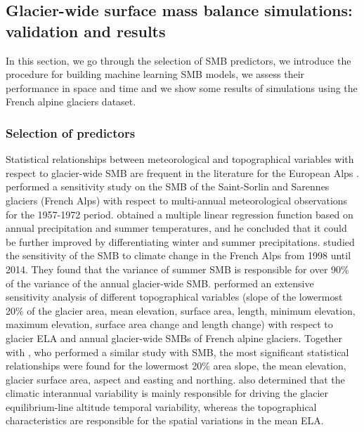 \subsection{Glacier-wide surface mass balance simulations: validation and results} \label{methods:case_study:SMB}

In this section, we go through the selection of SMB predictors, we introduce the procedure for building machine learning SMB models, we assess their performance in space and time and we show some results of simulations using the French alpine glaciers dataset. 

\subsubsection{Selection of predictors}

Statistical relationships between meteorological and topographical variables with respect to glacier-wide SMB are frequent in the literature for the European Alps \citep{hoinkes_glacier_1968}. \citet{martin_correlation_1974} performed a sensitivity study on the SMB of the Saint-Sorlin and Sarennes glaciers (French Alps) with respect to multi-annual meteorological observations for the 1957-1972 period. \citet{martin_correlation_1974} obtained a multiple linear regression function based on annual precipitation and summer temperatures, and he concluded that it could be further improved by differentiating winter and summer precipitations. \citet{six_sensitivity_2014} studied the sensitivity of the SMB to climate change in the French Alps from 1998 until 2014. They found that the variance of summer SMB is responsible for over 90\% of the variance of the annual glacier-wide SMB. \citet{rabatel_changes_2013, rabatel_spatio-temporal_2016} performed an extensive sensitivity analysis of different topographical variables (slope of the lowermost 20\% of the glacier area, mean elevation, surface area, length, minimum elevation, maximum elevation, surface area change and length change) with respect to glacier ELA and annual glacier-wide SMBs of French alpine glaciers. Together with \citet{huss_extrapolating_2012}, who performed a similar study with SMB, the most significant statistical relationships were found for the lowermost 20\% area slope, the mean elevation, glacier surface area, aspect and easting and northing. \citet{rabatel_changes_2013} also determined that the climatic interannual variability is mainly responsible for driving the glacier equilibrium-line altitude temporal variability, whereas the topographical characteristics are responsible for the spatial variations in the mean ELA. 

